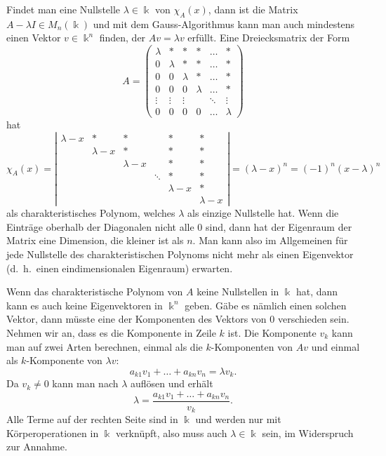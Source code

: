 Findet man eine Nullstelle $\lambda\in\Bbbk$ von $\chi_A(x)$,
dann ist die Matrix $A-\lambda I\in M_n(\Bbbk)$ und mit dem Gauss-Algorithmus
kann man auch mindestens einen Vektor $v\in \Bbbk^n$ finden,
der $Av=\lambda v$ erfüllt.
Eine Dreiecksmatrix der Form 
\[
A=\begin{pmatrix}
\lambda&   *   &   *   &   *   &\dots &*\\
   0   &\lambda&   *   &   *   &\dots &*\\
   0   &   0   &\lambda&   *   &\dots &*\\
   0   &   0   &   0   &\lambda&\dots &*\\
\vdots &\vdots &\vdots &       &\ddots&\vdots\\
   0   &   0   &   0   &   0   &\dots &\lambda
\end{pmatrix}
\]
hat
\[
\chi_A(x)
=
\left|
\begin{matrix}
\lambda-x &     *     &     *     &      &    *    &     *   \\
          & \lambda-x &     *     &      &    *    &     *   \\
          &           & \lambda-x &      &    *    &     *   \\
          &           &           &\ddots&    *    &     *   \\
          &           &           &      &\lambda-x&     *   \\
          &           &           &      &         &\lambda-x
\end{matrix}
\right|
=
(\lambda-x)^n
=
(-1)^n (x-\lambda)^n
\]
als charakteristisches Polynom, welches $\lambda$ als einzige
Nullstelle hat.
Wenn die Einträge oberhalb der Diagonalen nicht alle 0 sind,
dann hat der Eigenraum der Matrix eine Dimension, die kleiner ist als
$n$.
Man kann also im Allgemeinen für jede Nullstelle des charakteristischen
Polynoms nicht mehr als einen Eigenvektor (d.~h.~einen eindimensionalen
Eigenraum) erwarten.

Wenn das charakteristische Polynom von $A$ keine Nullstellen in $\Bbbk$ hat,
dann kann es auch keine Eigenvektoren in $\Bbbk^n$ geben.
Gäbe es nämlich einen solchen Vektor, dann müsste eine der Komponenten
des Vektors von $0$ verschieden sein.
Nehmen wir an, dass es die Komponente in Zeile $k$ ist.
Die Komponente $v_k$ kann man auf zwei Arten berechnen, einmal als
die $k$-Komponenten von $Av$ und einmal als $k$-Komponente von $\lambda v$:
\[
a_{k1}v_1+\dots+a_{kn}v_n = \lambda v_k.
\]
Da $v_k\ne 0$ kann man nach $\lambda$ auflösen und erhält
\[
\lambda = \frac{a_{k1}v_1+\dots + a_{kn}v_n}{v_k}.
\]
Alle Terme auf der rechten Seite sind in $\Bbbk$ und werden nur mit
Körperoperationen in $\Bbbk$ verknüpft, also muss auch $\lambda\in\Bbbk$
sein, im Widerspruch zur Annahme.

